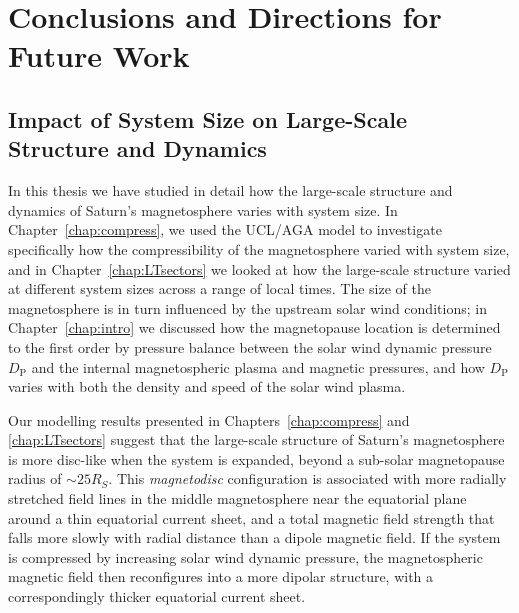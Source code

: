 \chapter{Conclusions and Directions for Future Work}
\label{chap:conclusions}
\section{Impact of System Size on Large-Scale Structure and Dynamics}
In this thesis we have studied in detail how the large-scale structure and dynamics of Saturn's magnetosphere varies with system size. In Chapter~\ref{chap:compress}, we used the UCL/AGA model to investigate specifically how the compressibility of the magnetosphere varied with system size, and in Chapter~\ref{chap:LTsectors} we looked at how the large-scale structure varied at different system sizes across a range of local times. The size of the magnetosphere is in turn influenced by the upstream solar wind conditions; in Chapter~\ref{chap:intro} we discussed how the magnetopause location is determined to the first order by pressure balance between the solar wind dynamic pressure $D_\mathrm{P}$ and the internal magnetospheric plasma and magnetic pressures, and how $D_\mathrm{P}$ varies with both the density and speed of the solar wind plasma.

Our modelling results presented in Chapters~\ref{chap:compress} and \ref{chap:LTsectors} suggest that the large-scale structure of Saturn's magnetosphere is more disc-like when the system is expanded, beyond a sub-solar magnetopause radius of ${\sim}{25}{R_S}$. This \textit{magnetodisc} configuration is associated with more radially stretched field lines in the middle magnetosphere near the equatorial plane around a thin equatorial current sheet, and a total magnetic field strength that falls more slowly with radial distance than a dipole magnetic field. If the system is compressed by increasing solar wind dynamic pressure, the magnetospheric magnetic field then reconfigures into a more dipolar structure, with a correspondingly thicker equatorial current sheet. 


